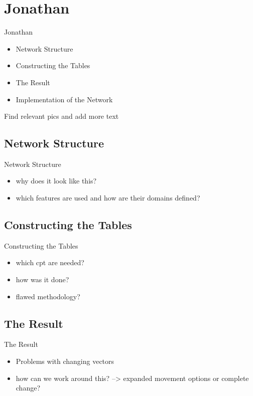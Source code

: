\section{Jonathan}
\begin{frame}{Jonathan}
\begin{itemize}
\item Network Structure
\item Constructing the Tables
\item The Result
\item Implementation of the Network
\end{itemize}

Find relevant pics and add more text
\end{frame}

\subsection{Network Structure}
\begin{frame}{Network Structure}

\begin{itemize}
\item why does it look like this?
\item which features are used and how are their domains defined?
\end{itemize}

\end{frame}


\subsection{Constructing the Tables}
\begin{frame}{Constructing the Tables}

\begin{itemize}

\item which cpt are needed?
\item how was it done? 
\item flawed methodology?
\end{itemize}

\end{frame}


\subsection{The Result}
\begin{frame}{The Result}

\begin{itemize}
\item Problems with changing vectors
\item how can we work around this? --> expanded movement options or complete change?

\end{itemize}

\end{frame}


